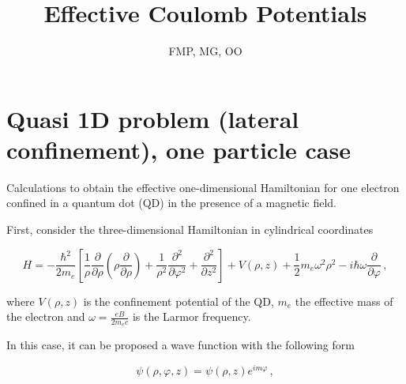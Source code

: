 \documentclass[a4paper,10pt]{article}
\title{Effective Coulomb Potentials}
\author{FMP, MG, OO}
\begin{document}
\renewcommand{\labelenumi}{\bf \alph{enumi})}
\renewcommand{\labelenumii}{\alph{enumi}$_\arabic{enumii}$)}
\newcommand{\ve}[1]{\mathbf{#1}}
\newcommand{\prob}[1]{ \stepcounter{problema}\noindent{\bf Problema
\arabic{problema}:}{\it#1}}
\newcommand{\versor}[1]{\,\hat{\!#1}}
\newcommand{\titulo}[1]{\noindent\begin{Large}{\bfseries\underline{#1}}\end{
Large} \\}
\newcommand{\subtitulo}[1]{\noindent\begin{large}{$\bullet$\scshape
#1}\end{large} \\}
\newcommand{\ket}[1]{\left| #1 \right\rangle}
\newcommand{\bra}[1]{\left\langle #1 \right|}
\newcommand{\braket}[3]{\left\langle #1 \right| #2 \left| #3 \right\rangle}
\newcommand{\overlap}[2]{\left\langle #1 \right| \left. #2 \right\rangle}
\maketitle


\section*{Quasi 1D problem (lateral confinement), one particle case}

Calculations to obtain the effective one-dimensional Hamiltonian for one
electron confined in a quantum dot (QD) in the presence of a magnetic field.

First, consider the three-dimensional Hamiltonian in cylindrical coordinates

\begin{equation}
H = -\frac{\hbar^2}{2 m_e}\left[\frac{1}{\rho}\frac{\partial}{\partial \rho}\left(\rho \frac{\partial}{\partial \rho} \right)
+ \frac{1}{\rho^2}\frac{\partial^2}{\partial \varphi^2}+\frac{\partial^2}{\partial z^2} \right] + V(\rho, z)
+ \frac{1}{2} m_e \omega^2 \rho^2 - i \hbar \omega \frac{\partial}{\partial \varphi}\, ,
\end{equation}

\noindent
where $V(\rho,z)$ is the confinement potential of the QD, $m_e$ the effective mass of the electron and
$\omega = \frac{e B}{2 m_e c}$ is the Larmor frequency.

In this case, it can be proposed a wave function with the following form

\begin{equation}
\psi(\rho,\varphi,z) = \psi(\rho,z) e^{i m \varphi}\,,
\end{equation}
\end{document}
